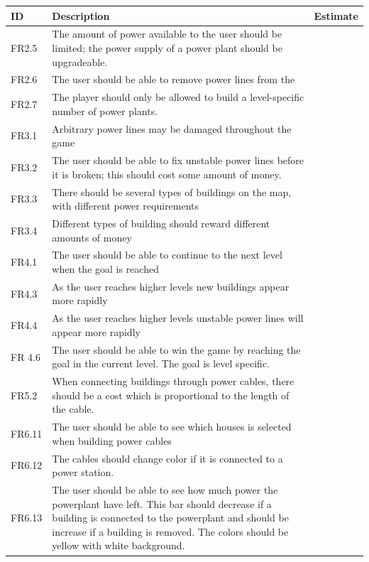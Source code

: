 	\begin{tabular}{| p{1.2cm} | p{8cm} | p{3cm} |}
		\hline
		\rowcolor{gray}
		ID & Description & Estimate \\ \hline

		FR2.5 & The amount of power available to the user should be limited; 
		the power supply of a power plant should be upgradeable. & \\ \hline

		FR2.6 & The user should be able to remove power lines from the 
		& \\ \hline

		FR2.7 & The player should only be allowed to build a level-specific 
		number of power plants. & \\ \hline

		FR3.1 & Arbitrary power lines may be damaged throughout the game & \\ \hline

		FR3.2 & The user should be able to fix unstable power lines before it is 
		broken; this should cost some amount of money. & \\ \hline

		FR3.3 & There should be several types of buildings on the map, with different 
		power requirements & \\ \hline

		FR3.4 & Different types of building should reward different amounts of 
		money & \\ \hline

		FR4.1 & The user should be able to continue to the next level when the goal is 
		reached & \\ \hline

		FR4.3 & As the user reaches higher levels new buildings appear more 
		rapidly & \\ \hline

		FR4.4 & As the user reaches higher levels unstable power lines will appear 
		more rapidly & \\ \hline

		FR 4.6 & The user should be able to win the game by reaching the goal in 
		the current level. The goal is level specific. & \\ \hline

		FR5.2 & When connecting buildings through power cables, there should be a 
		cost which is proportional to the length of the cable. & \\ \hline

		FR6.11 & The user should be able to see which houses is selected when 
		building power cables & \\ \hline

		FR6.12 & The cables should change color if it is connected to a power 
		station. & \\ \hline

		FR6.13 & The user should be able to see how much power the powerplant have 
		left. This bar should decrease if a building is connected to the powerplant 
		and should be increase if a building is removed. The colors should be yellow 
		with white background. & \\ \hline

	\end{tabular}

